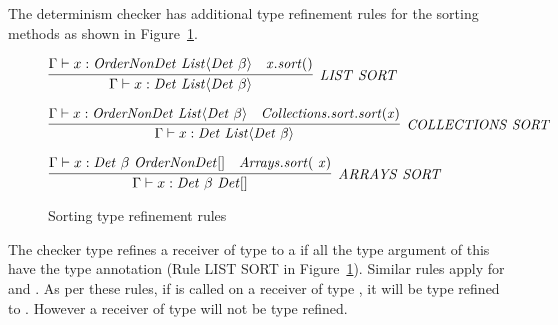 The determinism checker has additional type refinement rules for the sorting methods as shown in Figure~\ref{fig-sorting}. 
\begin{figure}
    $\infer[\sc{\mathit{LIST \  SORT}}]{\Gamma \vdash x : \mathit{Det \ List}\langle\mathit{Det} \ \beta\rangle}{\Gamma \vdash x : \mathit{OrderNonDet \ List}\langle\mathit{Det} \ \beta\rangle & \mathit{x.sort()}}$
    
    \bigskip
    
    $\infer[\sc{\mathit{COLLECTIONS \  SORT}}]{\Gamma \vdash x : \mathit{Det \ List}\langle\mathit{Det} \ \beta\rangle}{\Gamma \vdash x : \mathit{OrderNonDet \ List}\langle\mathit{Det} \ \beta\rangle & \mathit{Collections.sort.sort(x)}}$
    
    \bigskip
    
    $\infer[\sc{\mathit{ARRAYS \  SORT}}]{\Gamma \vdash x : \mathit{Det \ \beta \ Det[]} }{\Gamma \vdash x : \mathit{Det \ \beta \ OrderNonDet[]} & \mathit{Arrays.sort( \ x)}}$
    
    \caption{Sorting type refinement rules}
    \label{fig-sorting}
\end{figure}
The checker type refines a receiver of type  to a  if all the
type argument of this  have the type annotation  (Rule LIST SORT in Figure~\ref{fig-sorting}). Similar rules apply for  and .
As per these rules, if  is called on a receiver of type , it will
be type refined to . However a receiver of type  will not be type refined.


